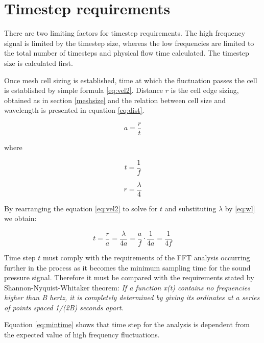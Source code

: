 \section{Timestep requirements} \label{timestepsize}
There are two limiting factors for timestep requirements. The high frequency signal is limited by the timestep size, whereas the low frequencies are limited to the total number of timesteps and physical flow time calculated. The timestep size is calculated first.

Once mesh cell sizing is established, time at which the fluctuation passes the cell is established by simple formula \ref{eq:vel2}. Distance $r$ is the cell edge sizing, obtained as in section \ref{meshsize} and the relation between cell size and wavelength is presented in equation \ref{eq:dist}.

\begin{equation} \label{eq:vel2}
a = \frac{r}{t}
\end{equation}

\noindent where

\begin{equation} \label{eq:time}
t = \frac{1}{f}
\end{equation}

\begin{equation} \label{eq:dist}
r = \frac{\lambda}{4}
\end{equation}

By rearranging the equation \ref{eq:vel2} to solve for $t$ and substituting $\lambda$ by \ref{eq:wl} we obtain:

\begin{equation} \label{eq:mintime}
t = \frac{r}{a} = \frac{\lambda}{4a} = \frac{a}{f} \cdot \frac{1}{4a} = \frac{1}{4f}
\end{equation}

Time step $t$ must comply with the requirements of the FFT analysis occurring further in the process as it becomes the minimum sampling time for the sound pressure signal. Therefore it must be compared with the requirements stated by Shannon-Nyquist-Whitaker theorem: \textit{If a function x(t) contains no frequencies higher than B hertz, it is completely determined by giving its ordinates at a series of points spaced 1/(2B) seconds apart.}

Equation \ref{eq:mintime} shows that time step for the analysis is dependent from the expected value of high frequency fluctuations. %

